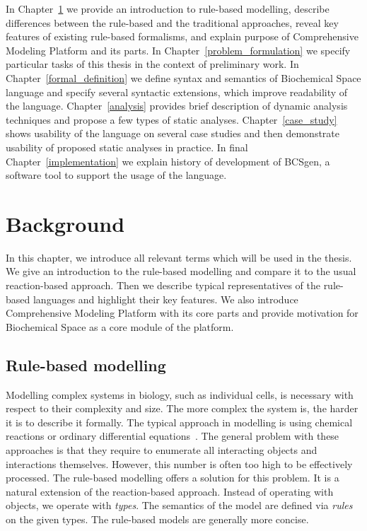\documentclass[12pt, twoside]{fithesis2} %
\begin{document}
In Chapter~\ref{background} we provide an introduction to rule-based modelling, describe differences between the rule-based and the traditional approaches, reveal key features of existing rule-based formalisms, and explain purpose of Comprehensive Modeling Platform and its parts. In Chapter~\ref{problem_formulation} we specify particular tasks of this thesis in the context of preliminary work. In Chapter~\ref{formal_definition} we define syntax and semantics of Biochemical Space language and specify several syntactic extensions, which improve readability of the language. Chapter~\ref{analysis} provides brief description of dynamic analysis techniques and propose a few types of static analyses. Chapter~\ref{case_study} shows usability of the language on several case studies and then demonstrate usability of proposed static analyses in practice. In final Chapter~\ref{implementation} we explain history of development of BCSgen, a software tool to support the usage of the language. 

\chapter{Background}
\label{background}

In this chapter, we introduce all relevant terms which will be used in the thesis. We give an introduction to the rule-based modelling and compare it to the usual reaction-based approach. Then we describe typical representatives of the rule-based languages and highlight their key features. We also introduce Comprehensive Modeling Platform with its core parts and provide motivation for Biochemical Space as a core module of the platform.

\section{Rule-based modelling}
\label{Rule-based basics}

Modelling complex systems in biology, such as individual cells, is necessary with respect to their complexity and size. The more complex the system is, the harder it is to describe it formally. The typical approach in modelling is using chemical reactions or ordinary differential equations~\cite{coddington1955theory}. The general problem with these approaches is that they require to enumerate all interacting objects and interactions themselves. However, this number is often too high to be effectively processed. The rule-based modelling offers a solution for this problem. It is a natural extension of the reaction-based approach. Instead of operating with objects, we operate with \emph{types}. The semantics of the model are defined via \emph{rules} on the given types. The rule-based models are generally more concise.
\end{document}
